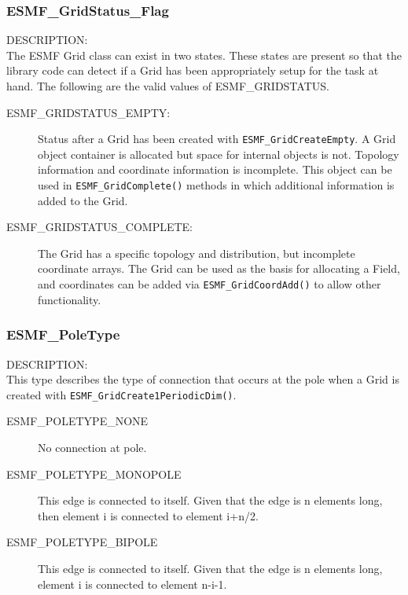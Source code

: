\subsubsection{ESMF\_GridStatus\_Flag}
\label{sec:opt:gridstatus}

{\sf DESCRIPTION:\\}
The ESMF Grid class can exist in two states. These states are
present so that the library code can detect if a Grid has been
appropriately setup for the task at hand. The following
are the valid values of ESMF\_GRIDSTATUS.

\medskip
\begin{description}
\item [ESMF\_GRIDSTATUS\_EMPTY:] Status after a Grid has been created with 
      {\tt ESMF\_GridCreateEmpty}.  A Grid object container is allocated but
      space for internal objects is not.  Topology information and coordinate
      information is incomplete.  This object can be used in {\tt ESMF\_GridComplete()}
      methods in which additional information is added to the Grid.
\item [ESMF\_GRIDSTATUS\_COMPLETE:] The Grid has a specific topology and
      distribution, but incomplete coordinate arrays.  The Grid can be used
      as the basis for allocating a Field, and coordinates can be added
      via {\tt ESMF\_GridCoordAdd()} to allow other functionality. 
\end{description}



\subsubsection{ESMF\_PoleType}
\label{sec:opt:poletype}
{\sf DESCRIPTION:\\}
This type describes the type of connection that occurs at the pole when a Grid is 
created with {\tt ESMF\_GridCreate1PeriodicDim()}.

\medskip
\begin{description}
\item [ESMF\_POLETYPE\_NONE] No connection at pole.

\item [ESMF\_POLETYPE\_MONOPOLE] This edge is connected to itself. Given
that the edge is n elements long, then element i is connected to
element i+n/2.

\item [ESMF\_POLETYPE\_BIPOLE] This edge is connected to itself. Given
that the edge is n elements long, element i is connected to element n-i-1.

\end{description}



